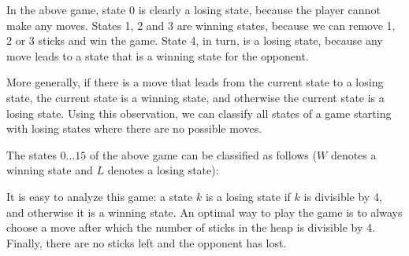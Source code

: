 In the above game, state 0 is clearly a
losing state, because the player cannot make
any moves.
States 1, 2 and 3 are winning states,
because we can remove 1, 2 or 3 sticks
and win the game.
State 4, in turn, is a losing state,
because any move leads to a state that
is a winning state for the opponent.

More generally, if there is a move that leads
from the current state to a losing state,
the current state is a winning state,
and otherwise the current state is a losing state.
Using this observation, we can classify all states
of a game starting with losing states where
there are no possible moves.

The states $0 \ldots 15$ of the above game
can be classified as follows
($W$ denotes a winning state and $L$ denotes a losing state):
\begin{center}
\end{center}

It is easy to analyze this game:
a state $k$ is a losing state if $k$ is
divisible by 4, and otherwise it
is a winning state.
An optimal way to play the game is
to always choose a move after which
the number of sticks in the heap
is divisible by 4.
Finally, there are no sticks left and
the opponent has lost.

